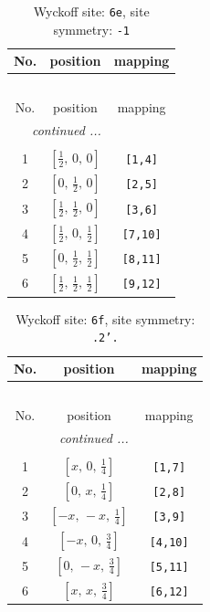 \documentclass[fleqn,8pt]{jsarticle}
\begin{document}
\renewcommand{\arraystretch}{1.2}
\begin{longtable}{ccc}
\caption{Wyckoff site: {\tt 6e}, site symmetry: {\tt -1}}
 \\
 \hline \hline
No. & position & mapping \\ \hline \endfirsthead

\multicolumn{2}{l}{\tablename\ \thetable{}} \\
 \hline \hline
No. & position & mapping \\ \hline \endhead

 \hline \hline
\multicolumn{2}{r}{\footnotesize\it continued ...} \\ \endfoot

 \hline \hline
\multicolumn{2}{r}{} \\ \endlastfoot

1 & $\left[ \frac{1}{2},\, 0,\, 0 \right]$ & {\tt [1,4]} \\ \hline
2 & $\left[ 0,\, \frac{1}{2},\, 0 \right]$ & {\tt [2,5]} \\ \hline
3 & $\left[ \frac{1}{2},\, \frac{1}{2},\, 0 \right]$ & {\tt [3,6]} \\ \hline
4 & $\left[ \frac{1}{2},\, 0,\, \frac{1}{2} \right]$ & {\tt [7,10]} \\ \hline
5 & $\left[ 0,\, \frac{1}{2},\, \frac{1}{2} \right]$ & {\tt [8,11]} \\ \hline
6 & $\left[ \frac{1}{2},\, \frac{1}{2},\, \frac{1}{2} \right]$ & {\tt [9,12]} \\
\end{longtable}
\renewcommand{\arraystretch}{1.2}
\begin{longtable}{ccc}
\caption{Wyckoff site: {\tt 6f}, site symmetry: {\tt .2'.}}
 \\
 \hline \hline
No. & position & mapping \\ \hline \endfirsthead

\multicolumn{2}{l}{\tablename\ \thetable{}} \\
 \hline \hline
No. & position & mapping \\ \hline \endhead

 \hline \hline
\multicolumn{2}{r}{\footnotesize\it continued ...} \\ \endfoot

 \hline \hline
\multicolumn{2}{r}{} \\ \endlastfoot

1 & $\left[ x,\, 0,\, \frac{1}{4} \right]$ & {\tt [1,7]} \\ \hline
2 & $\left[ 0,\, x,\, \frac{1}{4} \right]$ & {\tt [2,8]} \\ \hline
3 & $\left[ - x,\, - x,\, \frac{1}{4} \right]$ & {\tt [3,9]} \\ \hline
4 & $\left[ - x,\, 0,\, \frac{3}{4} \right]$ & {\tt [4,10]} \\ \hline
5 & $\left[ 0,\, - x,\, \frac{3}{4} \right]$ & {\tt [5,11]} \\ \hline
6 & $\left[ x,\, x,\, \frac{3}{4} \right]$ & {\tt [6,12]} \\
\end{longtable}
\end{document}
